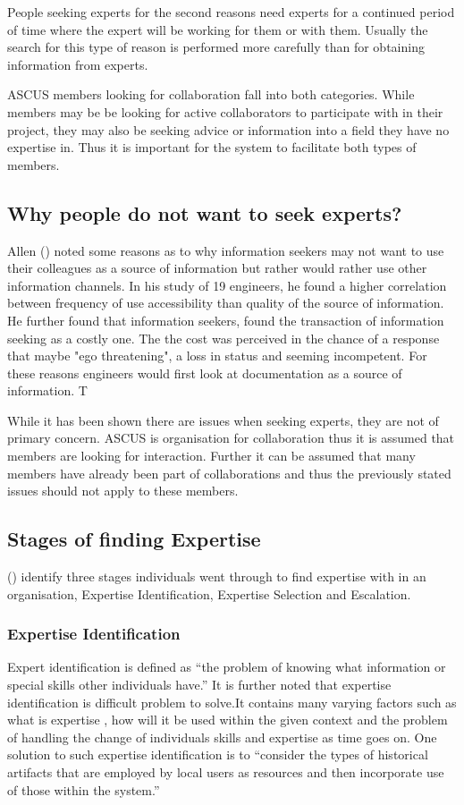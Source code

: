 \documentclass[a4paper,oneside,11pt]{report}
\begin{document}
People seeking experts for the second reasons need experts for a continued period of time where the expert will be working for them or with them. Usually the search for this type of reason is performed more carefully than for obtaining information from experts.

ASCUS members looking for collaboration fall into both categories. While members may be be looking for active collaborators to participate with in their project, they may also be seeking advice or information into a field they have no expertise in. Thus it is important for the system to facilitate both types of members.

\subsection{Why people do not want to seek experts?}
Allen (\citeyear{allen1977}) noted some reasons as to why information seekers may not want to use their colleagues as a source of information but rather would rather use other information channels. In his study of 19 engineers, he found a higher correlation between frequency of use accessibility than quality of the source of information. He further found that information seekers, found the transaction of information seeking as a costly one. The the cost was perceived in the chance of a response that maybe "ego threatening", a loss in status and seeming incompetent. For these reasons engineers would first look at documentation as a source of information. T

While it has been shown there are issues when seeking experts, they are not of primary concern. ASCUS is organisation for collaboration thus it is assumed that members are looking for interaction. Further it can be assumed that many members have already been part of collaborations and thus the previously stated issues should not apply to these members.
\subsection{Stages of finding Expertise}	
\citeauthor{mcdonalackerman1998}(\citeyear{mcdonalackerman1998}) identify three stages individuals went through to find expertise with in an organisation, Expertise Identification, Expertise Selection and Escalation.  
\subsubsection{Expertise Identification} 
Expert identification is defined as \enquote {the problem of knowing what information or special skills other individuals have.} It is further noted that expertise identification is difficult problem to solve.It contains many varying factors such as what is expertise , how will it be used within the given context and the problem of handling the change of individuals skills and expertise as time goes on. One solution to such expertise identification is to \enquote {consider the types of historical artifacts that are employed by local users as resources and then incorporate use of those within the system.}\autocite{mcdonalackerman1998}
\end{document}
